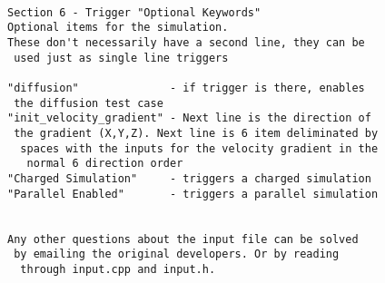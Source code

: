 \begin{verbatim}
  
Section 6 - Trigger "Optional Keywords"  
Optional items for the simulation.   
These don't necessarily have a second line, they can be
 used just as single line triggers  
  
"diffusion"              - if trigger is there, enables 
 the diffusion test case  
"init_velocity_gradient" - Next line is the direction of 
 the gradient (X,Y,Z). Next line is 6 item deliminated by
  spaces with the inputs for the velocity gradient in the
   normal 6 direction order  
"Charged Simulation"     - triggers a charged simulation  
"Parallel Enabled"       - triggers a parallel simulation   
  
  
Any other questions about the input file can be solved
 by emailing the original developers. Or by reading 
  through input.cpp and input.h.  
  
\end{verbatim}